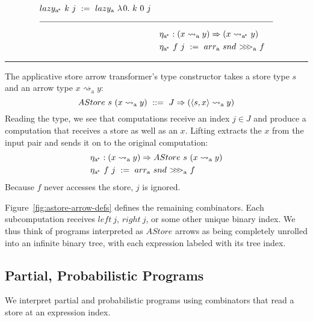 \documentclass[preprint]{sigplanconf}
\newcommand{\arrow}{\rightsquigarrow}
\newcommand{\arrowarr}{\ensuremath{arr}}
\newcommand{\arrowcomp}{\ensuremath{{>}\mspace{-6mu}{>}\mspace{-6mu}{>}}}
\newcommand{\arrowlazy}{\ensuremath{lazy}}
\newcommand{\arrowtrans}{\ensuremath{\eta}}
\newcommand{\gen}{_\mathrm{a}}
\newcommand{\genc}{_\mathrm{a^{\mspace{-2mu}*}}}
\begin{document}
\begin{figure*}[t]
\begin{align*}
\begin{aligned}[t]
\begin{aligned}[t]
		&\arrowlazy\genc~k~j \ := \ \arrowlazy\gen~\fun{0}{k~0~j}
	\end{aligned} \\
\\[-6pt]
\hline
\\[-6pt]
	&\begin{aligned}[t]
		&\arrowtrans\genc : (x \arrow\gen y) \tto (x \arrow\genc y) \\
		&\arrowtrans\genc~f~j \ := \ \arrowarr\gen~snd~\arrowcomp\gen~f
	\end{aligned}
\end{aligned}
\end{align*}
\hrule
\caption{$AStore$ (associative store) arrow transformer definitions.}
\label{fig:astore-arrow-defs}
\end{figure*}

The applicative store arrow transformer's type constructor takes a store type $s$ and an arrow type $x \arrow\gen y$:
\begin{equation}
	AStore~s~(x \arrow\gen y) \ ::= \ J \tto (\pair{s,x} \arrow\gen y)
\end{equation}
Reading the type, we see that computations receive an index $j \in J$ and produce a computation that receives a store as well as an $x$.
Lifting extracts the $x$ from the input pair and sends it on to the original computation:
\begin{equation}
\begin{aligned}
	&\arrowtrans\genc : (x \arrow\gen y) \tto AStore~s~(x \arrow\gen y) \\
	&\arrowtrans\genc~f~j \ := \ \arrowarr\gen~snd~\arrowcomp\gen~f
\end{aligned}
\end{equation}
Because $f$ never accesses the store, $j$ is ignored.

Figure~\ref{fig:astore-arrow-defs} defines the remaining combinators.
Each subcomputation receives $left~j$, $right~j$, or some other unique binary index.
We thus think of programs interpreted as $AStore$ arrows as being completely unrolled into an infinite binary tree, with each expression labeled with its tree index.

\subsection{Partial, Probabilistic Programs}
\label{sec:probabilistic-programs}

We interpret partial and probabilistic programs using combinators that read a store at an expression index.
\end{document}
